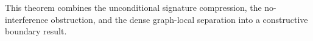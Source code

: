 This theorem combines the unconditional signature compression, the no-interference obstruction, and the dense graph-local separation into a constructive boundary result.